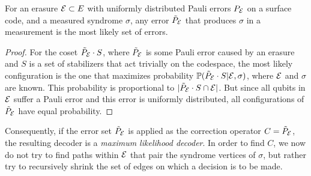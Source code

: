 \begin{lemma}\label{lem:peelinguni}
  For an erasure $\mathcal{E} \subset E$ with uniformly distributed Pauli errors $P_{\mathcal{E}}$ on a surface code, and a measured syndrome $\sigma$, any error  $\tilde{P}_{\mathcal{E}}$ that produces $\sigma$ in a measurement is the most likely set of errors. 
\end{lemma}
\begin{proof}
  For the coset $\tilde{P}_{\mathcal{E}}\cdot S$, where $\tilde{P}_{\mathcal{E}}$ is some Pauli error caused by an erasure and $S$ is a set of stabilizers that act trivially on the codespace, the most likely configuration is the one that maximizes probability $\mathbb{P}(\tilde{P}_{\mathcal{E}}\cdot S|\mathcal{E},\sigma)$, where $\mathcal{E}$ and $\sigma$ are known. This probability is proportional to $|\tilde{P}_{\mathcal{E}}\cdot S \cap\mathcal{E}|$. But since all qubits in $\mathcal{E}$ suffer a Pauli error and this error is uniformly distributed, all configurations of $\tilde{P}_{\mathcal{E}}$ have equal probability. 
\end{proof}

Consequently, if the error set $\tilde{P}_{\mathcal{E}}$ is applied as the correction operator $C=\tilde{P}_{\mathcal{E}}$, the resulting decoder is a \emph{maximum likelihood decoder}. In order to find $C$, we now do not try to find paths within $\mathcal{E}$ that pair the syndrome vertices of $\sigma$, but rather try to recursively shrink the set of edges on which a decision is to be made. 

